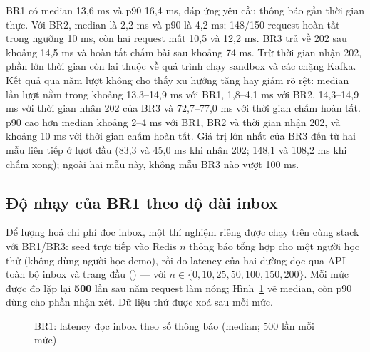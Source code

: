 BR1 có median 13,6 ms và p90 16,4 ms, đáp ứng yêu cầu thông báo gần thời gian thực. Với BR2, median là 2,2 ms và p90 là 4,2 ms; 148/150 request hoàn tất trong ngưỡng 10 ms, còn hai request mất 10,5 và 12,2 ms. BR3 trả về 202 sau khoảng 14,5 ms và hoàn tất chấm bài sau khoảng 74 ms. Trừ thời gian nhận 202, phần lớn thời gian còn lại thuộc về quá trình chạy sandbox và các chặng Kafka. Kết quả qua năm lượt không cho thấy xu hướng tăng hay giảm rõ rệt: median lần lượt nằm trong khoảng 13,3--14,9 ms với BR1, 1,8--4,1 ms với BR2, 14,3--14,9 ms với thời gian nhận 202 của BR3 và 72,7--77,0 ms với thời gian chấm hoàn tất. p90 cao hơn median khoảng 2--4 ms với BR1, BR2 và thời gian nhận 202, và khoảng 10 ms với thời gian chấm hoàn tất. Giá trị lớn nhất của BR3 đến từ hai mẫu liên tiếp ở lượt đầu (83,3 và 45,0 ms khi nhận 202; 148,1 và 108,2 ms khi chấm xong); ngoài hai mẫu này, không mẫu BR3 nào vượt 100 ms.

\subsection{Độ nhạy của BR1 theo độ dài inbox}
\label{sec:br1-inbox-scaling}

Để lượng hoá chi phí đọc inbox, một thí nghiệm riêng được chạy trên cùng stack với BR1/BR3: seed trực tiếp vào Redis $n$ thông báo tổng hợp cho một người học thử (không dùng người học demo), rồi đo latency của hai đường đọc qua API --- toàn bộ inbox và trang đầu () --- với $n \in \{0, 10, 25, 50, 100, 150, 200\}$. Mỗi mức được đo lặp lại \textbf{500} lần sau năm request làm nóng; Hình~\ref{fig:br1-inbox-scaling} vẽ median, còn p90 dùng cho phần nhận xét. Dữ liệu thử được xoá sau mỗi mức.

\begin{figure}[H]
\centering
{}
\caption{BR1: latency đọc inbox theo số thông báo (median; 500 lần mỗi mức)}
\label{fig:br1-inbox-scaling}
\end{figure}

